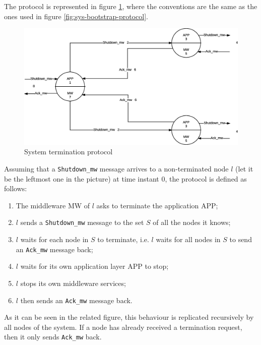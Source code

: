 The protocol is represented in figure \ref{fig:sys-termination-protocol}, where
the conventions are the same as the ones used in figure
\ref{fig:sys-bootstrap-protocol}.

\begin{figure}[H]
  \centering
  \includegraphics[width=\columnwidth]{images/solution/termination.eps}
  \caption{System termination protocol}
  \label{fig:sys-termination-protocol}
\end{figure}

Assuming that a \texttt{Shutdown\_mw} message arrives to a non-terminated node
$l$ (let it be the leftmost one in the picture) at time instant $0$, the
protocol is defined as follows:

\begin{enumerate}
\item The middleware MW of $l$ asks to terminate the application APP;
\item $l$ sends a \texttt{Shutdown\_mw} message to the set
  $S$ of all the nodes it knows;
\item $l$ waits for each node in $S$ to terminate, i.e. $l$ waits for all
  nodes in $S$ to send an \texttt{Ack\_mw} message back;
\item $l$ waits for its own application layer APP to stop;
\item $l$ stops its own middleware services;
\item $l$ then sends an \texttt{Ack\_mw} message back.
\end{enumerate}

As it can be seen in the related figure, this behaviour is replicated
recursively by all nodes of the system. If a node has already received a
termination request, then it only sends \texttt{Ack\_mw} back.
